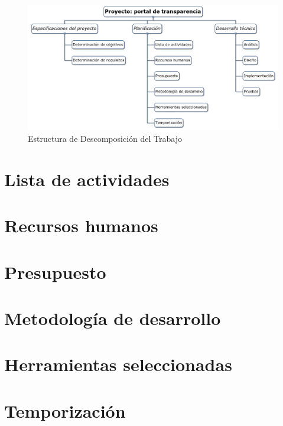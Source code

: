 \begin{figure}[htb]
  \begin{center}
  \includegraphics[width=1\textwidth]{imagenes/edt.png}
  \end{center}
  \caption[EDT]{Estructura de Descomposición del Trabajo}
\end{figure}

\section{Lista de actividades}

\section{Recursos humanos}

\section{Presupuesto}

\section{Metodología de desarrollo}

\section{Herramientas seleccionadas}

\section{Temporización}
